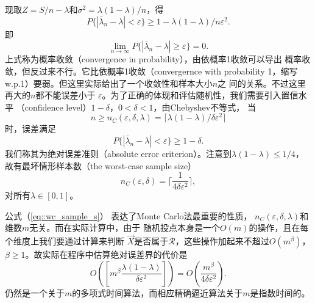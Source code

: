 现取$Z = S / n - \lambda$和$\sigma^2 = \lambda(1 - \lambda) / n$，得
\begin{equation}
  P\{|\bar{\lambda}_n - \lambda| < \varepsilon\} \geq 1 - \lambda(1 - \lambda) / n \varepsilon^2.
  \label{eq::col_cheb_ineq}
\end{equation}
即
\begin{equation}
  \lim_{n \to \infty} P\{|\bar{\lambda}_n - \lambda| \geq \varepsilon\} = 0.
  \label{eq::cov_pro}
\end{equation}
上式称为概率收敛（convergence in probability），由依概率1收敛可以导出
概率收敛，但反过来不行。它比依概率1收敛（convergernce with 
  probability 1，缩写w.p.1）要弱。但这里实际给出了一个收敛性和样本大小$n$之
间的关系。不过这里再大的$n$都不能误差小于
$\varepsilon$。为了正确的体现和评估随机性，我们需要引入置信水平
（confidence level）$1 - \delta$，$0 < \delta < 1$，由Chebyshev不等式，
当
\begin{equation}
  n \geq n_C(\varepsilon, \delta, \lambda) = \lceil \lambda (1 -
  \lambda) / \delta \varepsilon^2 \rceil
  \label{eq::cheb_ineq_est}
\end{equation}
时，误差满足
\begin{equation}
  P\{|\bar{\lambda}_n - \lambda| < \varepsilon\} \geq 1 - \delta.
  \label{eq::abs_error_crit}
\end{equation}
我们称其为绝对误差准则（absolute error criterion）。注意到$\lambda(1 -
\lambda) \leq 1 / 4$，故有最坏情形样本数（the worst-case sample size）
\begin{equation}
  n_C(\varepsilon, \delta) = \lceil \frac{1}{4 \delta \varepsilon^2}\rceil,
  \label{eq::wc_sample_s}
\end{equation}
对所有$\lambda \in [0, 1]$。

公式（\ref{eq::wc_sample_s}） 表达了Monte Carlo法最重要的性质，
$n_C(\varepsilon, \delta, \lambda)$和维数$m$无关。而在实际计算中，由于
随机投点本身是一个$O(m)$的操作，且在每个维度上我们要通过计算来判断
$\vec{X}$是否属于$\mathscr{R}$，这些操作加起来不超过$O(m^\beta)$，
$\beta \geq 1$。故实际在程序中估算绝对误差界的代价是
$$
O([m^\beta \frac{\lambda (1 - \lambda)}{\delta \varepsilon^2}])
= O(\frac{m^\beta}{4 \delta \varepsilon^2}).
$$
仍然是一个关于$m$的多项式时间算法，而相应精确逼近算法关于$m$是指数时间的。

